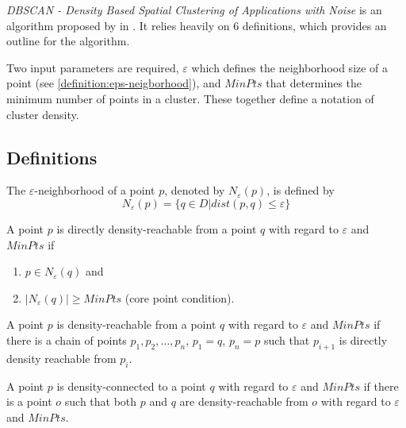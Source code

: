 \emph{DBSCAN - Density Based Spatial Clustering of Applications with 
Noise} is an algorithm proposed by \citeauthor{DBSCAN} in 
\citeyear{DBSCAN}. It relies heavily on 6 definitions, which provides an 
outline for the algorithm.

Two input parameters are required, $\varepsilon$ which defines the 
neighborhood size of a point (see \ref{definition:eps-neigborhood}), and
$MinPts$ that determines the minimum number of points in a cluster.
These together define a notation of cluster density.

\subsection{Definitions}

\begin{definition}
\label{definition:eps-neigborhood}
    The $\varepsilon$-neighborhood of a point $p$, denoted by
    $N_\varepsilon(p)$, is defined by 
    $$
        N_\varepsilon(p) = \{ q \in D | dist(p,q) \leq \varepsilon \}
    $$
\end{definition}

\begin{definition}
\label{definition:directly-density-reachable}
    A point $p$ is directly density-reachable from a point $q$ with 
    regard to $\varepsilon$ and $MinPts$ if
    \begin{enumerate}
      \item $ p \in N_\varepsilon(q) $ and
      \item $ |N_\varepsilon(q)| \geq MinPts $ (core point condition).
    \end{enumerate}
\end{definition}

\begin{definition}
\label{definition:density-reachable}
    A point $p$ is density-reachable from a point $q$ with regard to
    $\varepsilon$ and $MinPts$ if there is a chain of points 
    $p_1, p_2, \ldots, p_n$, $p_1=q$, $p_n=p$ such that $p_{i+1}$ is
    directly density reachable from $p_i$.
\end{definition}

\begin{definition}
\label{definition:density-connected}
    A point $p$ is density-connected to a point $q$ with regard to
    $\varepsilon$ and $MinPts$ if there is a point $o$ such that both
    $p$ and $q$ are density-reachable from $o$ with regard to 
    $\varepsilon$ and $MinPts$.
\end{definition}

